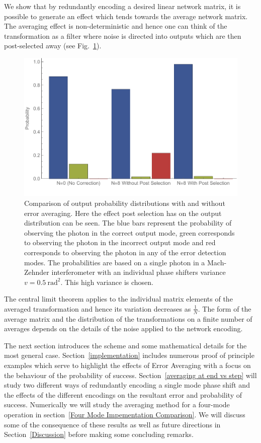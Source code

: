 \documentclass[aps,pra,twocolumn,superscriptaddress,numerical,floatfix]{revtex4-1}
\begin{document}
We show that by redundantly encoding a desired linear network matrix, it is possible to generate an effect which tends towards the average network matrix.   The averaging effect is non-deterministic and hence one can think of the transformation as a filter where noise is directed into outputs which are then post-selected away (see Fig.~\ref{fig:output_probabilities}).
\begin{figure}
	\begin{centering}
		\includegraphics[width=\columnwidth]{prob_distributions.pdf}
	\end{centering}
	\caption[Comparison of output probability distributions with and without Error Averaging.]{Comparison of output probability distributions with and without error averaging. Here the effect post selection has on the output distribution can be seen. The blue bars represent the probability of observing the photon in the correct output mode, green corresponds to observing the photon in the incorrect output mode and red corresponds to observing the photon in any of the error detection modes. The probabilities are based on a single photon in a Mach-Zehnder interferometer with an individual phase shifters variance $v=0.5\ \textrm{rad}^{2}$. This high variance is chosen.} 
	\label{fig:output_probabilities}
\end{figure}
The central limit theorem applies to the individual matrix elements of the averaged transformation and hence its variation decreases as $\frac{1}{N}$.  The form of the average matrix and the distribution of the transformations on a finite number of averages depends on the details of the noise applied to the network encoding. 

The next section introduces the scheme and some mathematical details for the most general case. Section~\ref{implementation} includes numerous proof of principle examples which serve to highlight the effects of Error Averaging with a focus on the behaviour of the probability of success. Section~\ref{averaging at end vs step} will study two different ways of redundantly encoding a single mode phase shift and the effects of the different encodings on the resultant error and probability of success.  Numerically we will study the averaging method for a four-mode operation in section~\ref{Four Mode Impementation Comparison}.  We will discuss some of the consequence of these results as well as future directions in Section~\ref{Discussion} before making some concluding remarks. 
\end{document}
